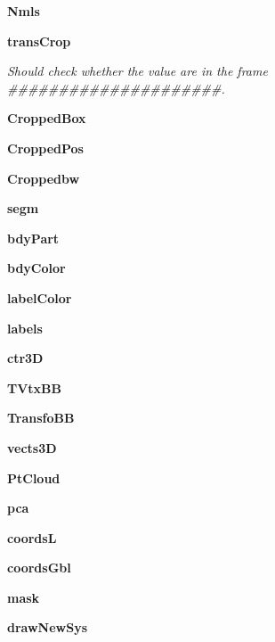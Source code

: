 \begin{DoxyCompactItemize}
\mbox{\label{class_r_g_b_d_1_1_r_g_b_d_a2926616892109cf5dc957cf88f44a82f}} 
{\bfseries Nmls}
\item 
\mbox{\label{class_r_g_b_d_1_1_r_g_b_d_aa675c35b936cca72cbf9859b397db76b}} 
\textbf{ trans\+Crop}
\begin{DoxyCompactList}\small\item\em Should check whether the value are in the frame \#\#\#\#\#\#\#\#\#\#\#\#\#\#\#\#\#\#\#\#\#. \end{DoxyCompactList}\item 
\mbox{\label{class_r_g_b_d_1_1_r_g_b_d_ac83ddaecc4b781c06e501638a8d5354e}} 
{\bfseries Cropped\+Box}
\item 
\mbox{\label{class_r_g_b_d_1_1_r_g_b_d_abcef839070008867031f8ca1039017a2}} 
{\bfseries Cropped\+Pos}
\item 
\mbox{\label{class_r_g_b_d_1_1_r_g_b_d_a3358964e5f345b88703dfc4833623e48}} 
{\bfseries Croppedbw}
\item 
\mbox{\label{class_r_g_b_d_1_1_r_g_b_d_a25864624766632d42831177eeb6d8ed5}} 
{\bfseries segm}
\item 
\mbox{\label{class_r_g_b_d_1_1_r_g_b_d_afc60c70d8fb641cf14106cab38d0db8a}} 
{\bfseries bdy\+Part}
\item 
\mbox{\label{class_r_g_b_d_1_1_r_g_b_d_a0046ee4e53365c5437a9ae049e6f8c92}} 
{\bfseries bdy\+Color}
\item 
\mbox{\label{class_r_g_b_d_1_1_r_g_b_d_a9d435f5f404e13eec01d1305836207a2}} 
{\bfseries label\+Color}
\item 
\mbox{\label{class_r_g_b_d_1_1_r_g_b_d_a28dbc577a55bf7a8d69e94f9f11574c7}} 
{\bfseries labels}
\item 
\mbox{\label{class_r_g_b_d_1_1_r_g_b_d_a288cc636f8b11e821fc4477e2addd572}} 
{\bfseries ctr3D}
\item 
\mbox{\label{class_r_g_b_d_1_1_r_g_b_d_ae2c5a82b192b0b63e1671ea17eed0dd8}} 
{\bfseries T\+Vtx\+BB}
\item 
\mbox{\label{class_r_g_b_d_1_1_r_g_b_d_aace80fcded2fa2291c6bfa46efedd40b}} 
{\bfseries Transfo\+BB}
\item 
\mbox{\label{class_r_g_b_d_1_1_r_g_b_d_a8097d6f8e77316d19625661a2fd439b1}} 
{\bfseries vects3D}
\item 
\mbox{\label{class_r_g_b_d_1_1_r_g_b_d_a2d582c01ef507af6a1c22fac8ea051ae}} 
{\bfseries Pt\+Cloud}
\item 
\mbox{\label{class_r_g_b_d_1_1_r_g_b_d_a509311f3e4cb1ac019372350f14bd3c9}} 
{\bfseries pca}
\item 
\mbox{\label{class_r_g_b_d_1_1_r_g_b_d_a6c7174b18612234c05db76fe08d3f073}} 
{\bfseries coordsL}
\item 
\mbox{\label{class_r_g_b_d_1_1_r_g_b_d_a1bc1e11456ca2c5ded372591033d70b2}} 
{\bfseries coords\+Gbl}
\item 
\mbox{\label{class_r_g_b_d_1_1_r_g_b_d_ae38af4e5847560201f47bd6c0855568c}} 
{\bfseries mask}
\item 
\mbox{\label{class_r_g_b_d_1_1_r_g_b_d_a1e8ef3b0545ddf5839ef6ad08d2dfaaa}} 
{\bfseries draw\+New\+Sys}
\end{DoxyCompactItemize}


